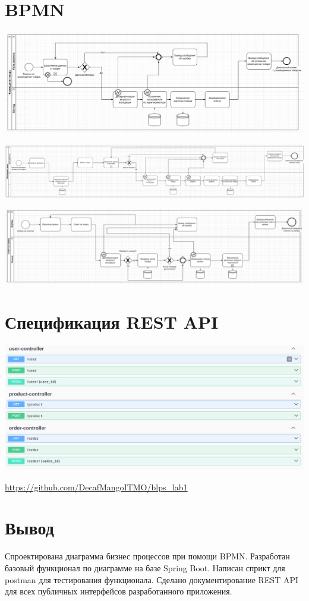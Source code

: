 \documentclass{article}
\begin{document}
\section*{BPMN}
\begin{center}
    \includegraphics[width=.9\textwidth]{bpmn1}
\end{center}
\begin{center}
    \includegraphics[width=.9\textwidth]{bpmn2.png}
\end{center}
\begin{center}
    \includegraphics[width=.9\textwidth]{bpmn3.png}
\end{center}

\section*{Спецификация REST API}
\begin{center}
    \includegraphics[width=.9\textwidth]{rest1.png}
\end{center}


\url{https://github.com/DecafMangoITMO/blps_lab1}

\section*{Вывод}
Спроектирована диаграмма бизнес процессов при помощи BPMN. Разработан базовый функционал по диаграмме на базе Spring Boot.
Написан сприкт для postman для тестирования функционала. Сделано документирование REST API для всех публичных интерфейсов разработанного приложения.
\end{document}
